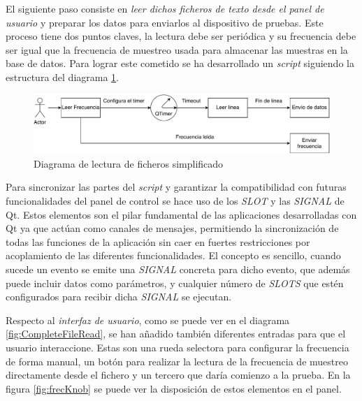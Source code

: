 
        El siguiente paso consiste en \textit{leer dichos ficheros de texto desde el panel de usuario} y preparar los datos para enviarlos al dispositivo de pruebas. Este proceso tiene dos puntos claves, la lectura debe ser periódica y su frecuencia debe ser igual que la frecuencia de muestreo usada para almacenar las muestras en la base de datos. Para lograr este cometido se ha desarrollado un \textit{script} siguiendo la estructura del diagrama \ref{fig:SimpleFileRead}. 

        \begin{figure}[H]  
                \centering
                        \includegraphics[width =\linewidth]{figuras/SimpleFileRead.pdf}
                \caption{Diagrama de lectura de ficheros simplificado}
                \label{fig:SimpleFileRead}
        \end{figure}

        Para sincronizar las partes del \textit{script} y garantizar la compatibilidad con futuras funcionalidades del panel de control se hace uso de los \textit{SLOT} y las \textit{SIGNAL} de Qt. Estos elementos son el pilar fundamental de las aplicaciones desarrolladas con Qt ya que actúan como canales de mensajes, permitiendo la sincronización de todas las funciones de la aplicación sin caer en fuertes restricciones por acoplamiento de las diferentes funcionalidades. El concepto es sencillo, cuando sucede un evento se emite una \textit{SIGNAL} concreta para dicho evento, que además puede incluir datos como parámetros, y cualquier número de \textit{SLOTS} que estén configurados para recibir dicha \textit{SIGNAL} se ejecutan. 

        Respecto al \textit{interfaz de usuario}, como se puede ver en el diagrama \ref{fig:CompleteFileRead}, se han añadido también diferentes entradas para que el usuario interaccione. Estas son una rueda selectora para configurar la frecuencia de forma manual, un botón para realizar la lectura de la frecuencia de muestreo directamente desde el fichero y un tercero que daría comienzo a la prueba. En la figura \ref{fig:frecKnob} se puede ver la disposición de estos elementos en el panel.

